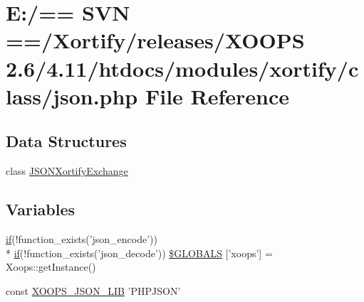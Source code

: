 \hypertarget{class_2json_8php}{\section{E\-:/== S\-V\-N ==/\-Xortify/releases/\-X\-O\-O\-P\-S 2.6/4.11/htdocs/modules/xortify/class/json.php File Reference}
\label{class_2json_8php}
}
\subsection*{Data Structures}
\begin{DoxyCompactItemize}
\item 
class \hyperlink{class_j_s_o_n_xortify_exchange}{J\-S\-O\-N\-Xortify\-Exchange}
\end{DoxyCompactItemize}
\subsection*{Variables}
\begin{DoxyCompactItemize}
\item 
\hyperlink{poll_2index_8php_ae404acbb304be6b6ac443de921697faf}{if}(!function\-\_\-exists('json\-\_\-encode')) \\*
\hyperlink{poll_2index_8php_ae404acbb304be6b6ac443de921697faf}{if}(!function\-\_\-exists('json\-\_\-decode')) \hyperlink{class_2json_8php_ab990bf70b4d23779b5e44c6ad5cbdf5d}{\$\-G\-L\-O\-B\-A\-L\-S} \mbox{[}'xoops'\mbox{]} = Xoops\-::get\-Instance()
\item 
const \hyperlink{class_2json_8php_a42fbc26b113afc08a5757bacf456cd8a}{X\-O\-O\-P\-S\-\_\-\-J\-S\-O\-N\-\_\-\-L\-I\-B} 'P\-H\-P\-J\-S\-O\-N'
\end{DoxyCompactItemize}



